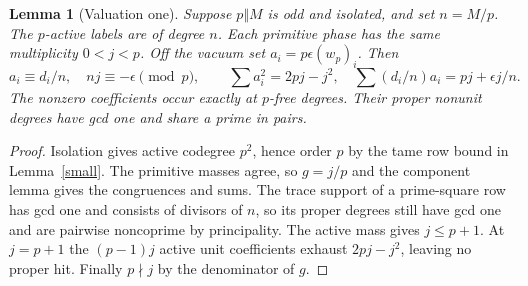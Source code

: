 \documentclass[11pt]{amsart}
\numberwithin{equation}{section}
\newtheorem{lemma}[theorem]{Lemma}
\theoremstyle{definition}
\theoremstyle{plain}
\begin{document}
\begin{lemma}[Valuation one]\label{result:weyl}
Suppose $p\Vert M$ is odd and isolated, and set $n=M/p$. The
$p$-active labels are of degree $n$. Each primitive phase has the
same multiplicity $0<j<p$. Off the vacuum set $a_i=p\epsilon(w_p)_i$.
Then
\begin{equation}
 a_i\equiv d_i/n,\quad nj\equiv-\epsilon\pmod p,\qquad
 \sum a_i^2=2pj-j^2,\quad \sum (d_i/n)a_i=pj+\epsilon j/n .
\end{equation}
The nonzero coefficients occur exactly at $p$-free degrees. Their
proper nonunit degrees have gcd one and share a prime in pairs.
\end{lemma}
\begin{proof}
Isolation gives active codegree $p^2$, hence order $p$ by the tame
row bound in Lemma~\ref{small}. The primitive masses agree,
so $g=j/p$ and the component lemma gives the congruences and sums.
The trace support of a prime-square row has gcd one and consists
of divisors of $n$, so its proper degrees still have gcd one and
are pairwise noncoprime by principality. The active mass gives
$j\le p+1$. At $j=p+1$ the $(p-1)j$ active unit coefficients
exhaust $2pj-j^2$, leaving no proper hit. Finally $p\nmid j$ by
the denominator of $g$.
\end{proof}
\end{document}

